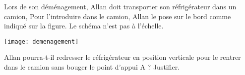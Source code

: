 
\medskip

Lors de son déménagement, Allan doit transporter son réfrigérateur dans un camion, Pour l'introduire
dans le camion, Allan le pose sur le bord comme indiqué sur la figure. Le schéma n'est pas à l'échelle.

\begin{center}
\texttt{[image: demenagement]}
\end{center}

\smallskip

Allan pourra-t-il redresser le réfrigérateur en position verticale pour le rentrer dans le camion sans
bouger le point d'appui A ? Justifier.

\vspace{0,5cm}

